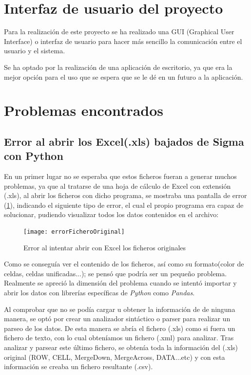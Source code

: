 \section{Interfaz de usuario del proyecto}\label{interfaz_de_usuario_del_proyecto}
Para la realización de este proyecto se ha realizado una GUI (Graphical User Interface) o interfaz de usuario para hacer más sencillo la comunicación entre el usuario y el sistema.

Se ha optado por la realización de una aplicación de escritorio, ya que era la mejor opción para el uso que se espera que se le dé en un futuro a la aplicación.



\section{Problemas encontrados}

\subsection{Error al abrir los Excel(.xls) bajados de Sigma con Python}

En un primer lugar no se esperaba que estos ficheros fueran a generar muchos problemas, ya que al tratarse de una hoja de cálculo de Excel con extensión (.xls), al abrir los ficheros con dicho programa, se mostraba una pantalla de error (\ref{fig:errorFicheroOriginal}), indicando el siguiente tipo de error, el cual el propio programa era capaz de solucionar, pudiendo visualizar todos los datos contenidos en el archivo:

\begin{figure}%
	\centering
	\texttt{[image: errorFicheroOriginal]}
	\caption{Error al intentar abrir con Excel los ficheros originales}\label{fig:errorFicheroOriginal}
\end{figure}


Como se conseguía ver el contenido de los ficheros, así como su formato(color de celdas, celdas unificadas...); se pensó que podría ser un pequeño problema. Realmente se apreció la dimensión del problema cuando se intentó importar y abrir los datos con librerías específicas de \emph{Python} como \emph{Pandas}.

Al comprobar que no se podía cargar u obtener la información de de ninguna manera, se optó por crear un analizador sintáctico o parser para realizar un parseo de los datos. De esta manera se abría el fichero (.xls) como si fuera un fichero de texto, con lo cual obteníamos un fichero (.xml) para analizar. Tras analizar y parsear este último fichero, se obtenía toda la información del (.xls) original (ROW, CELL, MergeDown, MergeAcross, DATA...etc) y con esta información se creaba un fichero resultante (.csv). 








